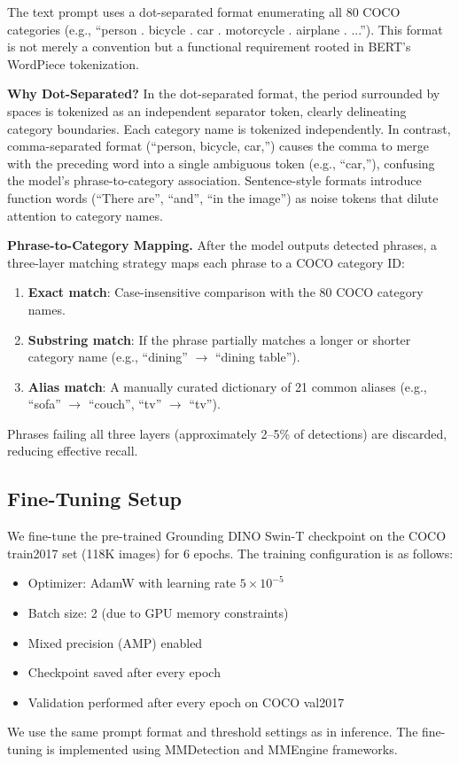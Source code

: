 \documentclass[10pt,journal,final,twocolumn]{IEEEtran}
\begin{document}
The text prompt uses a dot-separated format enumerating all 80 COCO categories (e.g., ``person . bicycle . car . motorcycle . airplane . ...''). This format is not merely a convention but a functional requirement rooted in BERT's WordPiece tokenization.

\textbf{Why Dot-Separated?} In the dot-separated format, the period surrounded by spaces is tokenized as an independent separator token, clearly delineating category boundaries. Each category name is tokenized independently. In contrast, comma-separated format (``person, bicycle, car,'') causes the comma to merge with the preceding word into a single ambiguous token (e.g., ``car,''), confusing the model's phrase-to-category association. Sentence-style formats introduce function words (``There are'', ``and'', ``in the image'') as noise tokens that dilute attention to category names.

\textbf{Phrase-to-Category Mapping.} After the model outputs detected phrases, a three-layer matching strategy maps each phrase to a COCO category ID:
\begin{enumerate}
    \item \textbf{Exact match}: Case-insensitive comparison with the 80 COCO category names.
    \item \textbf{Substring match}: If the phrase partially matches a longer or shorter category name (e.g., ``dining'' $\to$ ``dining table'').
    \item \textbf{Alias match}: A manually curated dictionary of 21 common aliases (e.g., ``sofa'' $\to$ ``couch'', ``tv'' $\to$ ``tv'').
\end{enumerate}
Phrases failing all three layers (approximately 2--5\% of detections) are discarded, reducing effective recall.

\subsection{Fine-Tuning Setup}

We fine-tune the pre-trained Grounding DINO Swin-T checkpoint on the COCO train2017 set (118K images) for 6 epochs. The training configuration is as follows:
\begin{itemize}
    \item Optimizer: AdamW with learning rate $5 \times 10^{-5}$
    \item Batch size: 2 (due to GPU memory constraints)
    \item Mixed precision (AMP) enabled
    \item Checkpoint saved after every epoch
    \item Validation performed after every epoch on COCO val2017
\end{itemize}
We use the same prompt format and threshold settings as in inference. The fine-tuning is implemented using MMDetection and MMEngine frameworks.
\end{document}
